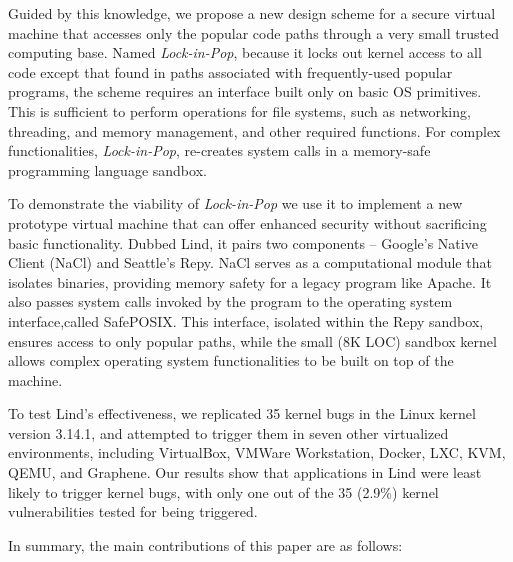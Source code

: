 Guided by this knowledge, we propose a new design scheme for a secure virtual machine that
accesses only the popular code paths through a very small trusted computing base.
Named \emph{Lock-in-Pop}, because it locks out kernel access to all code except
that found in paths associated with frequently-used popular programs, the scheme
 requires an interface built only on basic OS primitives. This is sufficient to
  perform operations for file systems, such as
networking, threading, and memory management, and other required functions.
For complex functionalities,  \emph{Lock-in-Pop}, re-creates system calls in
a memory-safe programming language sandbox.

To demonstrate the viability of \emph{Lock-in-Pop} we use it to implement a new
prototype virtual machine that can offer enhanced security without sacrificing
 basic functionality. Dubbed Lind, it pairs two components -- Google's Native Client
(NaCl) and Seattle's Repy. NaCl serves as a computational module that isolates
binaries, providing memory
safety for a legacy program like Apache. It also passes system calls invoked by
 the program to the operating system interface,called SafePOSIX. This interface,
  isolated within the Repy
sandbox, ensures access to only popular paths, while the small (8K LOC) sandbox
 kernel allows complex operating system functionalities to be built on top of the machine.

To test Lind's effectiveness, we replicated 35 kernel bugs in the Linux kernel
version 3.14.1,
and attempted to trigger them in seven other virtualized environments,
including VirtualBox, VMWare Workstation,
Docker, LXC, KVM, QEMU, and Graphene.
Our results show that applications in Lind were least likely to trigger kernel bugs,
with only one out of the 35 (2.9\%) kernel vulnerabilities tested for being triggered.

In summary, the main contributions of this paper are as follows:

